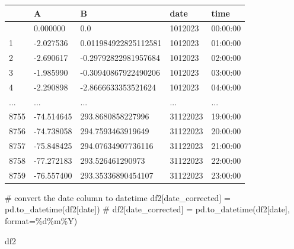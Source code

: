 \documentclass[
  letterpaper,
  DIV=11,
  numbers=noendperiod,
  oneside]{scrreprt}
\newenvironment{Shaded}{\begin{snugshade}}{\end{snugshade}}
\newcommand{\CommentTok}[1]{\textcolor[rgb]{0.37,0.37,0.37}{#1}}
\newcommand{\NormalTok}[1]{\textcolor[rgb]{0.00,0.23,0.31}{#1}}
\newcommand{\OperatorTok}[1]{\textcolor[rgb]{0.37,0.37,0.37}{#1}}
\newcommand{\StringTok}[1]{\textcolor[rgb]{0.13,0.47,0.30}{#1}}
\begin{document}
\begin{longtable}[]{@{}lllll@{}}
\toprule\noalign{}
& A & B & date & time \\
\midrule\noalign{}
\endhead
\bottomrule\noalign{}
\endlastfoot
0 & 0.000000 & 0.0 & 1012023 & 00:00:00 \\
1 & -2.027536 & 0.011984922825112581 & 1012023 & 01:00:00 \\
2 & -2.690617 & -0.29792822981957684 & 1012023 & 02:00:00 \\
3 & -1.985990 & -0.30940867922490206 & 1012023 & 03:00:00 \\
4 & -2.290898 & -2.8666633353521624 & 1012023 & 04:00:00 \\
... & ... & ... & ... & ... \\
8755 & -74.514645 & 293.8680858227996 & 31122023 & 19:00:00 \\
8756 & -74.738058 & 294.7593463919649 & 31122023 & 20:00:00 \\
8757 & -75.848425 & 294.07634907736116 & 31122023 & 21:00:00 \\
8758 & -77.272183 & 293.526461290973 & 31122023 & 22:00:00 \\
8759 & -76.557400 & 293.35336890454107 & 31122023 & 23:00:00 \\
\end{longtable}

\begin{Shaded}
\begin{Highlighting}[]
\CommentTok{\# convert the date column to datetime}
\NormalTok{df2[}\StringTok{\textquotesingle{}date\_corrected\textquotesingle{}}\NormalTok{] }\OperatorTok{=}\NormalTok{ pd.to\_datetime(df2[}\StringTok{\textquotesingle{}date\textquotesingle{}}\NormalTok{])}
\CommentTok{\# df2[\textquotesingle{}date\_corrected\textquotesingle{}] = pd.to\_datetime(df2[\textquotesingle{}date\textquotesingle{}], format=\textquotesingle{}\%d\%m\%Y\textquotesingle{})}

\NormalTok{df2}
\end{Highlighting}
\end{Shaded}
\end{document}
